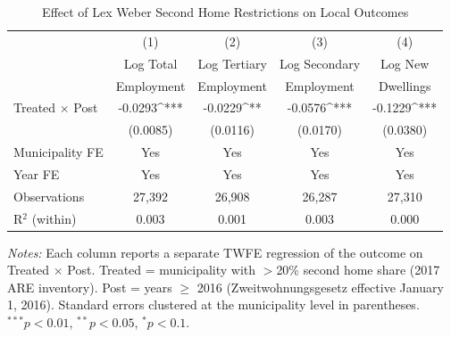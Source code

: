 \begin{table}[htbp]
\centering
\caption{Effect of Lex Weber Second Home Restrictions on Local Outcomes}
\label{tab:main}
\begin{tabular}{lcccc}
\toprule
 & (1) & (2) & (3) & (4) \\
 & Log Total & Log Tertiary & Log Secondary & Log New \\
 & Employment & Employment & Employment & Dwellings \\
\midrule
Treated $\times$ Post & -0.0293^{***} &-0.0229^{**} &-0.0576^{***} &-0.1229^{***} \\
 & (0.0085) & (0.0116) & (0.0170) & (0.0380) \\
\addlinespace
Municipality FE & Yes & Yes & Yes & Yes \\
Year FE & Yes & Yes & Yes & Yes \\
Observations & 27,392 & 26,908 & 26,287 & 27,310 \\
R$^2$ (within) & 0.003 & 0.001 & 0.003 & 0.000 \\
\bottomrule
\end{tabular}
\begin{tablenotes}[flushleft]\small
\item \textit{Notes:} Each column reports a separate TWFE regression of the outcome on Treated $\times$ Post.
Treated = municipality with $>$20\% second home share (2017 ARE inventory).
Post = years $\geq$ 2016 (Zweitwohnungsgesetz effective January 1, 2016).
Standard errors clustered at the municipality level in parentheses.
$^{***}p<0.01$, $^{**}p<0.05$, $^{*}p<0.1$.
\end{tablenotes}
\end{table}
